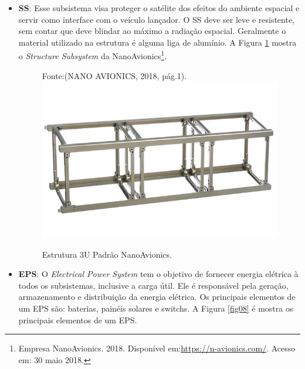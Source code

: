 \begin{itemize}

	\item \textbf{SS}: Esse subsistema visa proteger o satélite dos efeitos do ambiente espacial e servir como interface com o veículo lançador. O SS deve ser leve e resistente, sem contar que deve blindar ao máximo a radiação espacial. Geralmente o material utilizado na estrutura é alguma liga de alumínio.  A Figura \ref{fig07} mostra o \textit{Structure Subsystem} da NanoAvionics\footnote{Empresa NanoAvionics. 2018. Disponível em:\url{https://n-avionics.com/}. Acesso em: 30 maio 2018.}.

\begin{figure}[h]
	\centering
    Fonte:(NANO AVIONICS, 2018, pág.1).\linebreak
	\includegraphics[keepaspectratio=true,scale=0.4]{figuras/cubesat-structure-main.jpg}
	\caption{Estrutura 3U Padrão NanoAvionics.}
	\label{fig07}
\end{figure}

	\item \textbf{EPS}: O \textit{Electrical Power System} tem o objetivo de fornecer energia elétrica à todos os subsistemas, inclusive a carga útil. Ele é responsável pela geração, armazenamento e distribuição da energia elétrica. Os principais elementos de um EPS são: baterias, painéis solares e switchs. A Figura \ref{fig08} é mostra os principais elementos de um EPS.
    

\end{itemize}
